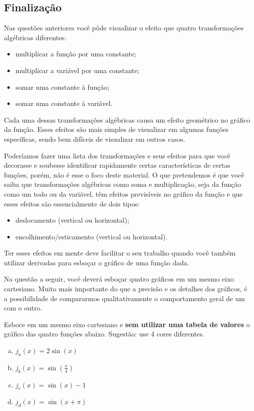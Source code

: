\documentclass[main.tex]{subfiles}
\begin{document}
\subsection*{Finalização}

Nas questões anteriores você pôde visualizar o efeito que quatro transformações algébricas diferentes:

\begin{itemize}
 \item multiplicar a função por uma constante;
 \item multiplicar a variável por uma constante;
 \item somar uma constante à função;
 \item somar uma constante à variável.
\end{itemize}

Cada uma dessas transformações algébricas causa um efeito geométrico no gráfico da função. Esses efeitos são mais simples de visualizar em algumas funções específicas, sendo bem difíceis de visualizar em outros casos. 

Poderíamos fazer uma lista dos transformações e seus efeitos para que você decorasse e soubesse identificar rapidamente certas características de certas funções, porém, não é esse o foco deste material. O que pretendemos é que você saiba que transformações algébricas como soma e multiplicação, seja da função como um todo ou da variável, têm efeitos previsíveis no gráfico da função e que esses efeitos são essencialmente de dois tipos:

\begin{itemize}
 \item deslocamento (vertical ou horizontal);
 \item encolhimento/esticamento (vertical ou horizontal).
\end{itemize}

Ter esses efeitos em mente deve facilitar o seu trabalho quando você também utilizar derivadas para esboçar o gráfico de uma função dada.

Na questão a seguir, você deverá esboçar quatro gráficos em um mesmo eixo cartesiano. Muito mais importante do que a precisão e os detalhes dos gráficos, é a possibilidade de compararmos qualitativamente o comportamento geral de um com o outro.

\begin{questao}
Esboce em um mesmo eixo cartesiano e \textbf{sem utilizar uma tabela de valores} o gráfico das quatro funções abaixo. Sugestão: use 4 cores diferentes.
\begin{enumerate}[a)]
\item $j_a (x)=2\sin(x)$
\item $j_b (x)=\sin(\frac{x}{4})$
\item $j_c (x)=\sin(x)-1$
\item $j_d (x)=\sin(x+\pi)$
\end{enumerate}
\end{questao}
\end{document}
